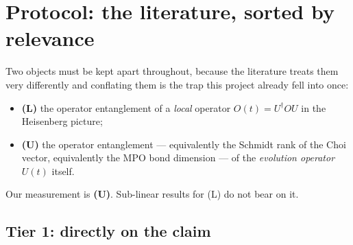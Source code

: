 \documentclass[11pt]{article}
\theoremstyle{plain}
\theoremstyle{remark}
\begin{document}
\begin{abstract}
\textbf{New in rev.\ 3.} Three additions, all resting on exact arithmetic.
\S\ref{sec:ceiling}: $\chi$ does not grow forever, and the ceiling is
closed-form --- $(N^2{+}15)/4$ for $W_{156}/W_{198}$, $F(k)F(k{+}1)$ for
$W_{108}$, $F(k)\big(F(k){+}3F(k{-}1)\big)$ for $W_{201}$ --- confirmed here at
$N=7,9,11,13$ by exact rank over $\mathbb Q(\sqrt2)$ with no cutoff anywhere.
\emph{A ceiling polynomial in $N$ and uniform in $t$ is a sharper contradiction
of the exponential baseline than any statement about a growth window, and it
answers the objection that a linear window is merely a light cone before
saturation.} \S\ref{sec:reflection}: the slope acquires a mechanism --- kink
reflection between stationary walls --- with the measured law
$\text{slope} = 2(k-1)$ in the number $k$ of straddling-gap length classes,
$N$-independent across $N=12,14$. \S\ref{sec:method}: the growth window is
narrowed to $4\le t\le\min(N/2,12)$, and a methodological warning is recorded
that cost this project three false results --- a \emph{fixed} singular-value
cutoff manufactured a feature in three independent pipelines, in both
directions.
\end{abstract}

\tableofcontents

\section{Protocol: the literature, sorted by relevance}
\label{sec:protocol}

Two objects must be kept apart throughout, because the literature treats them
very differently and conflating them is the trap this project already fell into
once:
\begin{itemize}
\item \textbf{(L)} the operator entanglement of a \emph{local} operator $O(t) =
U^\dagger O U$ in the Heisenberg picture;
\item \textbf{(U)} the operator entanglement --- equivalently the Schmidt rank
of the Choi vector, equivalently the MPO bond dimension --- of the
\emph{evolution operator} $U(t)$ itself.
\end{itemize}
Our measurement is \textbf{(U)}. Sub-linear results for (L) do not bear on it.

\subsection{Tier 1: directly on the claim}
\end{document}
